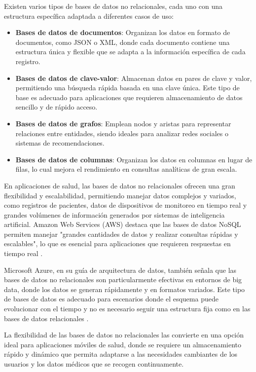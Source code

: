 Existen varios tipos de bases de datos no relacionales, cada uno con una estructura específica adaptada a diferentes casos de uso:
\begin{itemize}
    \item \textbf{Bases de datos de documentos}: Organizan los datos en formato de documentos, como JSON o XML, donde cada documento contiene una estructura única y flexible que se adapta a la información específica de cada registro.
    \item \textbf{Bases de datos de clave-valor}: Almacenan datos en pares de clave y valor, permitiendo una búsqueda rápida basada en una clave única. Este tipo de base es adecuado para aplicaciones que requieren almacenamiento de datos sencillo y de rápido acceso.
    \item \textbf{Bases de datos de grafos}: Emplean nodos y aristas para representar relaciones entre entidades, siendo ideales para analizar redes sociales o sistemas de recomendaciones.
    \item \textbf{Bases de datos de columnas}: Organizan los datos en columnas en lugar de filas, lo cual mejora el rendimiento en consultas analíticas de gran escala.
\end{itemize}

En aplicaciones de salud, las bases de datos no relacionales ofrecen una gran flexibilidad y escalabilidad, permitiendo manejar datos complejos y variados, como registros de pacientes, datos de dispositivos de monitoreo en tiempo real y grandes volúmenes de información generados por sistemas de inteligencia artificial. Amazon Web Services (AWS) destaca que las bases de datos NoSQL permiten manejar "grandes cantidades de datos y realizar consultas rápidas y escalables", lo que es esencial para aplicaciones que requieren respuestas en tiempo real \parencite{aws2023}.

Microsoft Azure, en su guía de arquitectura de datos, también señala que las bases de datos no relacionales son particularmente efectivas en entornos de big data, donde los datos se generan rápidamente y en formatos variados. Este tipo de bases de datos es adecuado para escenarios donde el esquema puede evolucionar con el tiempo y no es necesario seguir una estructura fija como en las bases de datos relacionales \parencite{microsoft2023}.

La flexibilidad de las bases de datos no relacionales las convierte en una opción ideal para aplicaciones móviles de salud, donde se requiere un almacenamiento rápido y dinámico que permita adaptarse a las necesidades cambiantes de los usuarios y los datos médicos que se recogen continuamente.

